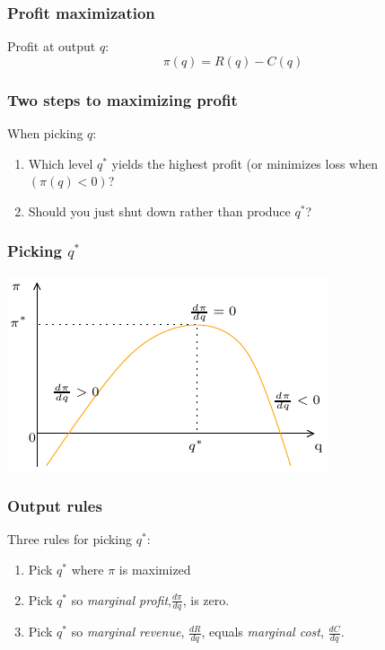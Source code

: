 \documentclass[xcolor=pdftex,dvipsnames]{beamer}
\begin{document}
\begin{frame}
\frametitle{Profit maximization}
Profit at output $q$:
\[
\pi(q) = R(q)-C(q)
\]
\bigskip

\bigskip

\end{frame}





\begin{frame}
\frametitle{Two steps to maximizing profit}
When picking $q$:
\begin{enumerate}[<+->]
\item Which level $q^*$ yields the highest profit (or minimizes loss
  when $(\pi(q)<0)$?
\item Should you just shut down rather than produce $q^*$?
\end{enumerate}
\end{frame}

\begin{frame}\frametitle{Picking $q^*$}
\begin{center}
\includegraphics[scale=1.25]{pics/ProfMax}
\end{center}
\end{frame}



\begin{frame}
\frametitle{Output rules}
Three rules for picking $q^*$:
\begin{enumerate}[<+->]
\item Pick $q^*$ where $\pi$ is maximized

\item Pick $q^*$ so \emph{marginal profit},$\frac{d\pi}{dq}$, is
  zero.
\item Pick $q^*$ so \emph{marginal revenue}, $\frac{d R}{dq}$,
equals \emph{marginal cost}, $\frac{d C}{dq}$.
\end{enumerate}
\end{frame}
\end{document}
